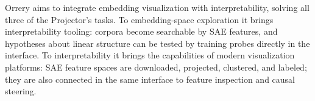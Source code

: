 \documentclass[11pt]{article}
\begin{document}
Orrery aims to integrate embedding visualization with interpretability, solving all three of the Projector's tasks. To embedding-space exploration it brings interpretability tooling: corpora become searchable by SAE features, and hypotheses about linear structure can be tested by training probes directly in the interface. To interpretability it brings the capabilities of modern visualization platforms: SAE feature spaces are downloaded, projected, clustered, and labeled; they are also connected in the same interface to feature inspection and causal steering.










\end{document}
